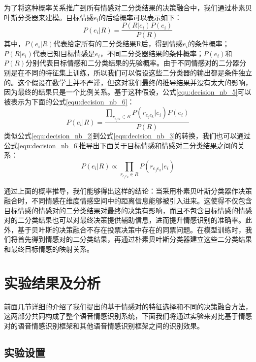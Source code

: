 为了将这种概率关系推广到所有情感对二分类结果的决策融合中，我们通过朴素贝叶斯分类器来建模。目标情感$e_i$的后验概率可以表示如下：
\begin{equation}
\label{equ:decision_nb_5}
    P(e_i|R) = \frac{P(R|e_i)P(e_i)}{P(R)}
\end{equation}
其中，$P(e_i|R)$代表给定所有的二分类结果R后，得到情感$e_i$的条件概率；$P(R|e_i)$代表已知目标情感是$e_i$，不同二分类器结果的条件概率；$P(e_i)$和$P(R)$分别代表目标情感和二分类结果的先验概率。由于不同情感对的二分器分别是在不同的特征集上训练，所以我们可以假设这些二分类器的输出都是条件独立的。这个假设在数学上并不严谨，但这对我们最终的推导结果并没有太大的影响，因为最终的结果只是一个比例关系。基于这种假设，公式\ref{equ:decision_nb_5}可以被表示为下面的公式\ref{equ:decision_nb_6}：
\begin{equation}
\label{equ:decision_nb_6}
    P(e_i|R) = \frac{\prod_{r_{e_je_k} \in R}P(r_{e_je_k}|e_i)P(e_i)}{P(R)}
\end{equation}
类似公式\ref{equ:decision_nb_2}到公式\ref{equ:decision_nb_3}的转换，我们也可以通过公式\ref{equ:decision_nb_6}推导出下面关于目标情感和情感对二分类结果之间的关系：
\begin{equation}
\label{equ:decision_nb_7}
    P(e_i|R) \propto \prod_{r_{e_je_k} \in R}P(r_{e_je_k}|e_i)
\end{equation}

通过上面的概率推导，我们能够得出这样的结论：当采用朴素贝叶斯分类器作决策融合时，不同情感在维度情感空间中的距离信息能够被引入进来。这使得不仅包含目标情感的情感对的二分类结果对最终的决策有影响，而且不包含目标情感的情感对的二分类结果也可以对最终决策提供辅助信息，进而提升情感识别的准确率。此外，基于贝叶斯的决策融合不存在投票决策中存在的同票问题。在模型训练时，我们将首先得到情感对的二分类结果，再通过朴素贝叶斯分类器建立这些二分类结果和最终目标情感的映射关系。

\section{实验结果及分析}
\label{sec:experiment}

前面几节详细的介绍了我们提出的基于情感对的特征选择和不同的决策融合方法，这两部分共同构成了整个语音情感识别系统，下面我们将通过实验来对比基于情感对的语音情感识别框架和其他语音情感识别框架之间的识别效果。

\subsection{实验设置}
\label{ssec:experiment_setup}

